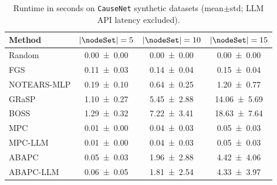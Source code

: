 \begin{table}[t]
    \caption{Runtime in seconds on \texttt{CauseNet} synthetic datasets (mean$\pm$std; LLM API latency excluded).}
    \label{tab:runtime_scaling_final}
    \centering
    \normalsize
    \setlength{\tabcolsep}{8pt}
    \begin{tabular}{lccc}
    \toprule
    \textbf{Method} & \textbf{$|\nodeSet|=5$} & \textbf{$|\nodeSet|=10$} & \textbf{$|\nodeSet|=15$} \\
    \midrule
    Random & \num{0.00 +- 0.00} & \num{0.00 +- 0.00} & \num{0.00 +- 0.00} \\
    FGS & \num{0.11 +- 0.03} & \num{0.14 +- 0.04} & \num{0.15 +- 0.04} \\
    NOTEARS-MLP & \num{0.19 +- 0.10} & \num{0.64 +- 0.25} & \num{1.20 +- 0.77} \\
    GRaSP & \num{1.10 +- 0.27} & \num{5.45 +- 2.88} & \num{14.06 +- 5.69} \\
    BOSS & \num{1.29 +- 0.32} & \num{7.22 +- 3.41} & \num{18.63 +- 7.64} \\
    MPC & \num{0.01 +- 0.00} & \num{0.04 +- 0.03} & \num{0.05 +- 0.03} \\
    MPC-LLM & \num{0.01 +- 0.00} & \num{0.04 +- 0.03} & \num{0.05 +- 0.03} \\
    ABAPC & \num{0.05 +- 0.03} & \num{1.96 +- 2.88} & \num{4.42 +- 4.06} \\
    ABAPC-LLM & \num{0.06 +- 0.05} & \num{1.81 +- 2.54} & \num{4.33 +- 3.97} \\
    \bottomrule
    \end{tabular}
\end{table}
